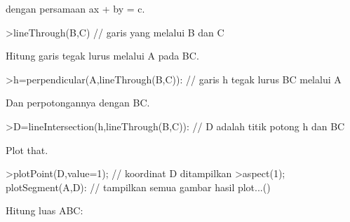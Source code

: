 \documentclass[12pt,arial,letterpaper]{book}
\begin{document}
\begin{eulernootebook}
\begin{eulercomment}
\begin{eulercomment}
\begin{eulernootebook}
\begin{eulercomment}
\begin{eulercomment}
\begin{eulercomment}
\begin{eulercomment}
\begin{eulercomment}
\begin{eulercomment}
\begin{eulernotebook}
\begin{eulercomment}
\begin{eulercomment}
\begin{eulercomment}
dengan persamaan ax + by = c.
\end{eulercomment}
\begin{eulerprompt}
>lineThrough(B,C) // garis yang melalui B dan C
\end{eulerprompt}
\begin{euleroutput}
  [-1,  2,  2]
\end{euleroutput}
\begin{eulercomment}
Hitung garis tegak lurus melalui A pada BC.
\end{eulercomment}
\begin{eulerprompt}
>h=perpendicular(A,lineThrough(B,C)): // garis h tegak lurus BC melalui A
\end{eulerprompt}
\begin{eulercomment}
Dan perpotongannya dengan BC.
\end{eulercomment}
\begin{eulerprompt}
>D=lineIntersection(h,lineThrough(B,C)): // D adalah titik potong h dan BC
\end{eulerprompt}
\begin{eulercomment}
Plot that.
\end{eulercomment}
\begin{eulerprompt}
>plotPoint(D,value=1); // koordinat D ditampilkan
>aspect(1); plotSegment(A,D): // tampilkan semua gambar hasil plot...()
\end{eulerprompt}
\begin{eulercomment}
Hitung luas ABC:


\end{eulercomment}
\end{eulercomment}
\end{eulercomment}
\end{eulernotebook}
\end{eulercomment}
\end{eulercomment}
\end{eulercomment}
\end{eulercomment}
\end{eulercomment}
\end{eulercomment}
\end{eulernootebook}
\end{eulercomment}
\end{eulercomment}
\end{eulernootebook}
\end{document}
